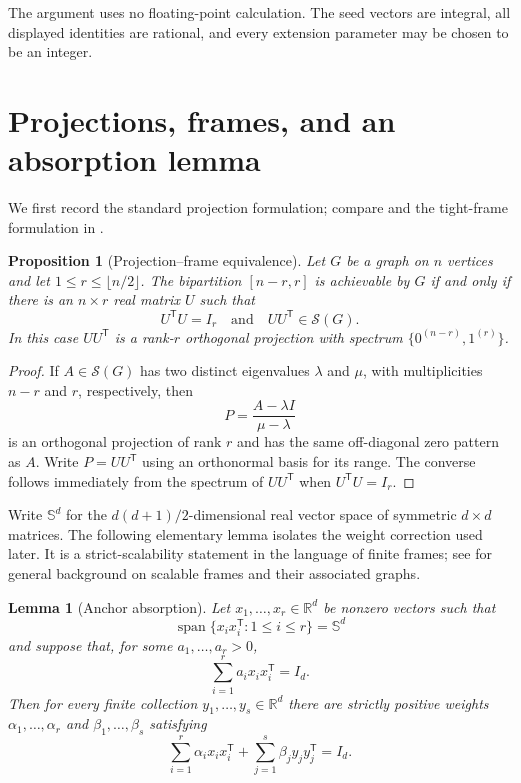 \documentclass[11pt]{article}
\newtheorem{proposition}[theorem]{Proposition}
\newtheorem{lemma}[theorem]{Lemma}
\theoremstyle{remark}
\newcommand{\R}{\mathbb{R}}
\newcommand{\Sn}{\mathbb{S}}
\newcommand{\cS}{\mathcal{S}}
\newcommand{\Span}{\operatorname{span}}
\begin{document}
The argument uses no floating-point calculation.  The seed vectors are
integral, all displayed identities are rational, and every extension
parameter may be chosen to be an integer.

\section{Projections, frames, and an absorption lemma}

We first record the standard projection formulation; compare
\cite[Lemma~2.2]{AdmEtAl2019} and the tight-frame formulation in
\cite{AbdollahiNajafi2018,ChenEtAl2014,FurstGrotts2021}.

\begin{proposition}[Projection--frame equivalence]\label{prop:projection}
Let $G$ be a graph on $n$ vertices and let
$1\le r\le\lfloor n/2\rfloor$.  The bipartition $[n-r,r]$ is achievable by
$G$ if and only if there is an $n\times r$ real matrix $U$ such that
\[
 U^{\mathsf T}U=I_r
 \quad\text{and}\quad
 UU^{\mathsf T}\in\cS(G).
\]
In this case $UU^{\mathsf T}$ is a rank-$r$ orthogonal projection with
spectrum $\{0^{(n-r)},1^{(r)}\}$.
\end{proposition}

\begin{proof}
If $A\in\cS(G)$ has two distinct eigenvalues $\lambda$ and $\mu$, with
multiplicities $n-r$ and $r$, respectively, then
\[
        P=\frac{A-\lambda I}{\mu-\lambda}
\]
is an orthogonal projection of rank $r$ and has the same off-diagonal zero
pattern as $A$.  Write $P=UU^{\mathsf T}$ using an orthonormal basis for its
range.  The converse follows immediately from the spectrum of
$UU^{\mathsf T}$ when $U^{\mathsf T}U=I_r$.
\end{proof}

Write $\Sn^d$ for the $d(d+1)/2$-dimensional real vector space of symmetric
$d\times d$ matrices.  The following elementary lemma isolates the weight
correction used later.  It is a strict-scalability statement in the language
of finite frames; see
\cite{KutyniokEtAl2013,CahillChen2013,AyyanarJohnsonThilak2025} for general
background on scalable frames and their associated graphs.

\begin{lemma}[Anchor absorption]\label{lem:absorption}
Let $x_1,\ldots,x_r\in\R^d$ be nonzero vectors such that
\[
 \Span\{x_i x_i^{\mathsf T}:1\le i\le r\}=\Sn^d
 \tag{2.1}\label{eq:span}
\]
and suppose that, for some $a_1,\ldots,a_r>0$,
\[
       \sum_{i=1}^r a_i x_i x_i^{\mathsf T}=I_d.
 \tag{2.2}\label{eq:anchorparseval}
\]
Then for every finite collection $y_1,\ldots,y_s\in\R^d$ there are strictly
positive weights $\alpha_1,\ldots,\alpha_r$ and
$\beta_1,\ldots,\beta_s$ satisfying
\[
 \sum_{i=1}^r \alpha_i x_i x_i^{\mathsf T}
 +\sum_{j=1}^s \beta_j y_j y_j^{\mathsf T}=I_d.
 \tag{2.3}\label{eq:absorbed}
\]
\end{lemma}
\end{document}
